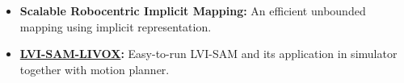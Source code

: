 \documentclass[11pt,a4paper,sans]{moderncv}        %
\begin{document}
\begin{itemize}


    \item \textbf{Scalable Robocentric Implicit Mapping:} An efficient unbounded mapping using implicit representation.




\item \textbf{\href{https://github.com/jianhengLiu/LVI-SAM-LIVOX}{LVI-SAM-LIVOX}:} Easy-to-run LVI-SAM and its application in simulator together with motion planner.






\end{itemize}
\end{document}
